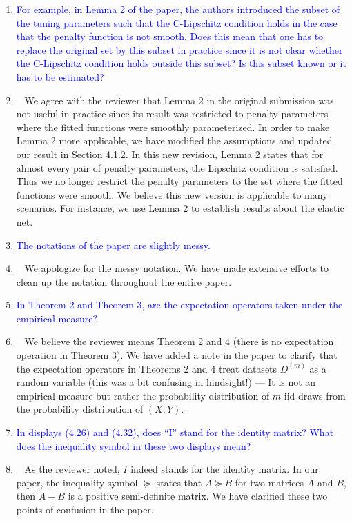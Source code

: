 \documentclass[]{article}
\newcommand{\point}[1]{\item \textcolor{blue}{#1}}
\newcommand{\reply}{\item[]\ }
\begin{document}
\begin{enumerate}
{		}
		
		\point{
			For example, in Lemma 2 of the paper, the authors introduced the subset of the tuning parameters such that the C-Lipschitz condition holds in the case that the penalty function is not smooth.
			Does this mean that one has to replace the original set by this subset in practice since it is not clear whether the C-Lipschitz condition holds outside this subset?
			Is this subset known or it has to be estimated?
		}
		\reply{
		We agree with the reviewer that Lemma 2 in the original submission was not useful in practice since its result was restricted to penalty parameters where the fitted functions were smoothly parameterized.
		In order to make Lemma 2 more applicable, we have modified the assumptions and updated our result in Section 4.1.2.
		In this new revision, Lemma 2 states that for almost every pair of penalty parameters, the Lipschitz condition is satisfied.
		Thus we no longer restrict the penalty parameters to the set where the fitted functions were smooth.
		We believe this new version is applicable to many scenarios.
		For instance, we use Lemma 2 to establish results about the elastic net.
		}
		
		\point{
		The notations of the paper are slightly messy.
		}
	
		\reply{
			We apologize for the messy notation. We have made extensive efforts to clean up the notation throughout the entire paper.
		}
	
		\point{
			In Theorem 2 and Theorem 3, are the expectation operators taken under the empirical measure?
		}
		\reply{
			We believe the reviewer means Theorem 2 and 4 (there is no expectation operation in Theorem 3).
			We have added a note in the paper to clarify that the expectation operators in Theorems 2 and 4 treat datasets $D^{(m)}$ as a random variable 
			(this was a bit confusing in hindsight!) --- It is not an empirical measure but rather the probability distribution of $m$ iid draws from the probability distribution of $(X,Y)$.
		}
		\point{
			In displays (4.26) and (4.32), does “I” stand for the identity matrix? What does the inequality symbol in these two displays mean?
		}
	
		\reply{
			As the reviewer noted, $I$ indeed stands for the identity matrix.
			In our paper, the inequality symbol $\succeq$ states that $A \succeq B$ for two matrices $A$ and $B$, then $A - B$ is a positive semi-definite matrix.
			We have clarified these two points of confusion in the paper.
		}
	\end{enumerate} 
	
\end{document}
